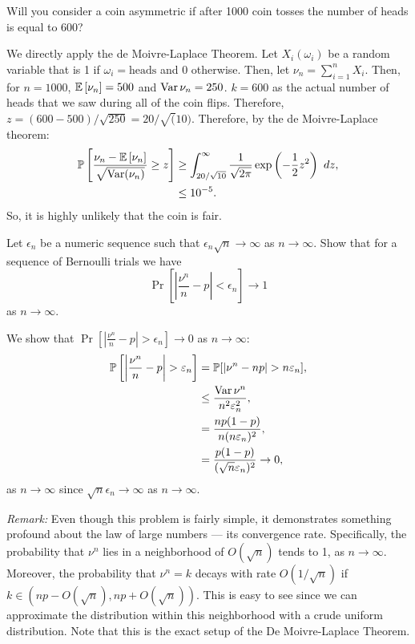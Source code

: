 \begin{problem}{3}
    Will you consider a coin asymmetric if after 1000 coin tosses the number of heads is equal to 600?
\end{problem}
\begin{solution}
    We directly apply the de Moivre-Laplace Theorem. Let $X_i(\omega_i)$ be a random variable that is 1 if $\omega_i =\text{heads}$ and 0 otherwise. Then, let $\nu_n = \sum_{i=1}^n X_i$. Then, for $n=1000$, $\mathbb{E}\left[\nu_n\right] = 500$ and $\operatorname{Var}{\nu_n} = 250$. $k=600$ as the actual number of heads that we saw during all of the coin flips. Therefore, 
    $z = (600 - 500) / \sqrt{250} = 20/\sqrt(10)$. Therefore, by the de Moivre-Laplace theorem:
    \begin{align*}
        \mathbb{P}\left[\frac{\nu_n - \mathbb{E}\left[\nu_n\right]}{\sqrt{\operatorname{Var}(\nu_n)}} \geq z\right] &\geq \int_{20/\sqrt{10}}^\infty \frac{1}{\sqrt{2\pi}}\exp\left(-\frac{1}{2}z^2\right)~dz, \\
        &\leq 10^{-5}.
    \end{align*}
    So, it is highly unlikely that the coin is fair.
\end{solution}
\begin{problem}{4}
    Let $\epsilon_n$ be a numeric sequence such that $\epsilon_n\sqrt{n}\to\infty$ as $n\to\infty$. Show that for a sequence of Bernoulli trials we have 
    \[
        \Pr\left[\left|\frac{\nu^n}{n} - p\right| < \epsilon_n\right] \to 1    
    \]
    as $n \to\infty$. 
\end{problem}
\begin{solution}
    We show that $\Pr\left[\left|\frac{\nu^n}{n} - p\right| > \epsilon_n\right] \to 0$ as $n\to \infty$:
    \begin{align*}
        \mathbb{P}\left[\left|\frac{\nu^n}{n} - p\right| > \varepsilon_n\right] &= \mathbb{P}[|\nu^n - np| > n\varepsilon_n], \\
        &\leq \frac{\operatorname{Var}{\nu^n}}{n^2 \varepsilon_n^2}, \\
        &= \frac{np(1-p)}{n(n\varepsilon_n)^2}, \\
        &= \frac{p(1-p)}{(\sqrt{n}\varepsilon_n)^2} \to 0,
    \end{align*}
    as $n\to\infty$ since $\sqrt{n}\epsilon_n \to \infty$ as $n\to\infty$.

    \textcolor{brickred}{\textit{Remark:}} Even though this problem is fairly simple, it demonstrates something profound about the law of large numbers --- its convergence rate. Specifically, the probability that $\nu^n$ lies in a neighborhood of $O(\sqrt{n})$ tends to 1, as $n\to\infty$. Moreover, the probability that $\nu^n = k$ decays with rate $O(1/\sqrt{n})$ if $k \in (np - O(\sqrt{n}), np + O(\sqrt{n}))$. This is easy to see since we can approximate the distribution within this neighborhood with a crude uniform distribution. Note that this is the exact setup of the De Moivre-Laplace Theorem.
\end{solution}
